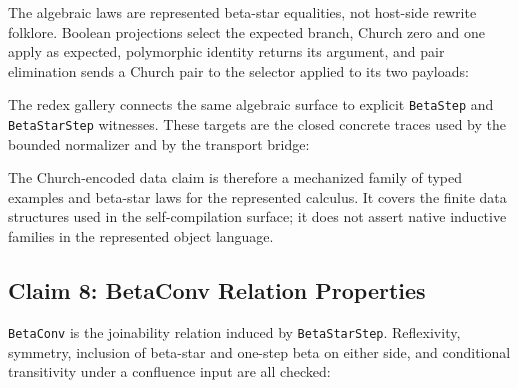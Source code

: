 The algebraic laws are represented beta-star equalities, not host-side
rewrite folklore.  Boolean projections select the expected branch, Church
zero and one apply as expected, polymorphic identity returns its argument,
and pair elimination sends a Church pair to the selector applied to its two
payloads:


The redex gallery connects the same algebraic surface to explicit
\texttt{BetaStep} and \texttt{BetaStarStep} witnesses.  These targets are the
closed concrete traces used by the bounded normalizer and by the transport
bridge:


The Church-encoded data claim is therefore a mechanized family of typed
examples and beta-star laws for the represented calculus.  It covers the
finite data structures used in the self-compilation surface; it does not
assert native inductive families in the represented object language.

\subsection{Claim 8: BetaConv Relation Properties}
\label{subsec:claim-betaconv-relation-properties}

\texttt{BetaConv} is the joinability relation induced by
\texttt{BetaStarStep}.  Reflexivity, symmetry, inclusion of beta-star and
one-step beta on either side, and conditional transitivity under a confluence
input are all checked:


